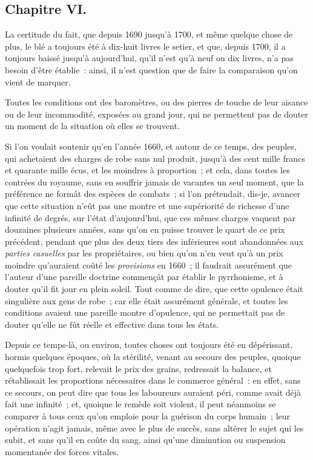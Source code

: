 \documentclass[french,twoside]{book} %
\begin{document}
\subsection[{Chapitre VI.}]{Chapitre VI.}
\noindent La certitude du fait, que depuis 1690 jusqu’à 1700, et même quelque chose de plus, le blé a toujours été à dix-huit livres le setier, et que, depuis 1700, il a toujours baissé jusqu’à aujourd’hui, qu’il n’est qu’à neuf ou dix livres, n’a pas besoin d’être établie : ainsi, il n’est question que de faire la comparaison qu’on vient de marquer.\par
Toutes les conditions ont des baromètres, ou des pierres de touche de leur aisance ou de leur incommodité, exposées au grand jour, qui ne permettent pas de douter un moment de la situation où elles se trouvent.\par
Si l’on voulait soutenir qu’en l’année 1660, et autour de ce temps, des peuples, qui achetaient des charges de robe sans nul produit, jusqu’à des cent mille francs et quarante mille écus, et les moindres à proportion ; et cela, dans toutes les contrées du royaume, sans en souffrir jamais de vacantes un seul moment, que la préférence ne formât des espèces de combats ; si l’on prétendait, dis-je, avancer que cette situation n’eût pas une montre et une supériorité de richesse d’une infinité de degrés, sur l’état d’aujourd’hui, que ces mêmes charges vaquent par douzaines plusieurs années, sans qu’on en puisse trouver le quart de ce prix précédent, pendant que plus des deux tiers des inférieures sont abandonnées aux {\itshape parties casuelles} par les propriétaires, ou bien qu’on n’en veut qu’à un prix moindre qu’auraient coûté les {\itshape provisions} en 1660 ; il faudrait assurément que l’auteur d’une pareille doctrine commençât par établir le pyrrhonisme, et à douter qu’il fit jour en plein soleil. Tout comme de dire, que cette opulence était singulière aux gens de robe ; car elle était assurément générale, et toutes les conditions avaient une pareille montre d’opulence, qui ne permettait pas de douter qu’elle ne fût réelle et effective dans tous les états.\par
Depuis ce temps-là, ou environ, toutes choses ont toujours été en dépérissant, hormis quelques époques, où la stérilité, venant au secours des peuples, quoique quelquefois trop fort, relevait le prix des grains, redressait la balance, et rétablissait les proportions nécessaires dans le commerce général : en effet, sans ce secours, on peut dire que tous les laboureurs auraient péri, comme avait déjà fait une infinité ; et, quoique le remède soit violent, il peut néanmoins se comparer à tous ceux qu’on emploie pour la guérison du corps humain ; leur opération n’agit jamais, même avec le plus de succès, sans altérer le sujet qui les subit, et sans qu’il en coûte du sang, ainsi qu’une diminution ou suspension momentanée des forces vitales.\par
\end{document}
